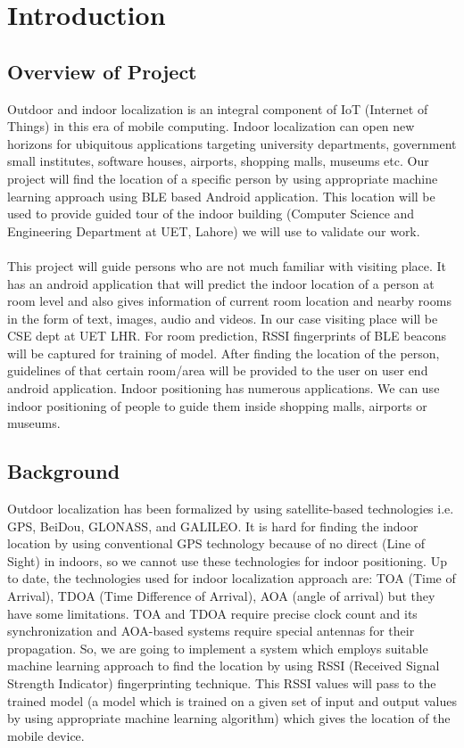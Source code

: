 \documentclass{article}
\begin{document}
\section{Introduction}

\subsection{Overview of Project}
Outdoor and indoor localization is an integral component of  IoT (Internet of Things) in this era of mobile computing. Indoor localization can open new horizons for ubiquitous applications targeting university departments, government small institutes, software houses, airports, shopping malls, museums etc. Our project will find the location of a specific person by using appropriate machine learning approach using BLE based Android application. This location will be used to provide guided tour of the indoor building (Computer Science and Engineering Department at UET, Lahore) we will use to validate our work. 
\\\\
This project will guide persons who are not much familiar with visiting place. It has an android application that will predict the indoor location of a person at room level and also gives information of current room location and nearby rooms in the form of text, images, audio and videos. In our case visiting place will be CSE dept at UET LHR. For room prediction, RSSI fingerprints of BLE beacons will be captured for training of model. After finding the location of the person, guidelines of that certain room/area will be provided to the user on user end android application. Indoor positioning has numerous applications. We can use indoor positioning of people to guide them inside shopping malls, airports or museums. 



\subsection{Background}
Outdoor localization has been formalized by using satellite-based technologies i.e. GPS\cite{GPS}, BeiDou\cite{cooper2016loco}, GLONASS\cite{cooper2016loco}, and GALILEO\cite{GALILEO}. It is hard for finding the indoor location by using conventional GPS technology because of no direct (Line of Sight)\cite{akram2018censloc} in indoors, so we cannot use these technologies for indoor positioning. Up to date, the technologies used for indoor localization approach are: TOA (Time of Arrival), TDOA (Time Difference of Arrival), AOA (angle of arrival) but they have some limitations. TOA and TDOA require precise clock count and its synchronization and AOA-based systems require special antennas for their propagation. So, we are going to implement a system which employs suitable machine learning approach to find the location by using RSSI (Received Signal Strength Indicator) fingerprinting technique. This RSSI values will pass to the trained model (a model which is trained on a given set of input and output values by using appropriate machine learning algorithm) which gives the location of the mobile device.
\end{document}
